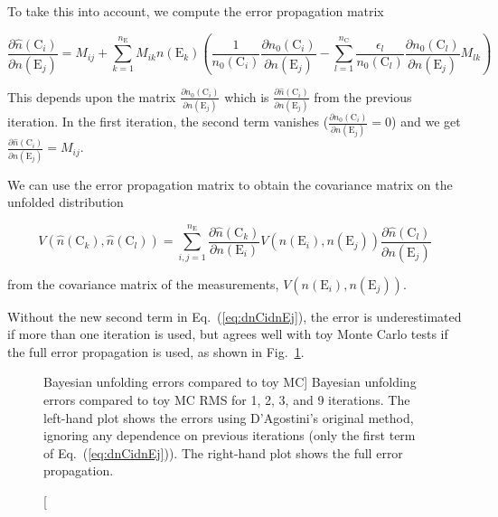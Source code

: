 \documentclass[12pt,a4paper]{article}
\newcommand{\E}{\mathrm{E}}
\newcommand{\C}{\mathrm{C}}
\newcommand{\dd}[2]{\frac{\partial{#1}}{\partial{#2}}}
\begin{document}
To take this into account, we compute the error propagation matrix

\begin{equation}
\dd{\hat{n}(\C_i)}{n(\E_j)} = M_{ij} + \sum_{k=1}^{n_{\E}} M_{ik} n(\E_k)
\left( \frac{1}{n_0(\C_i)} \dd{n_0(\C_i)}{n(\E_j)} - \sum_{l=1}^{n_{\C}} \frac{\epsilon_l}{n_0(\C_l)} \dd{n_0(\C_l)}{n(\E_j)} M_{lk} \right)
\label{eq:dnCidnEj}
\end{equation}

This depends upon the matrix $\dd{n_0(\C_i)}{n(\E_j)}$ which is $\dd{\hat{n}(\C_i)}{n(\E_j)}$ from the previous iteration.
In the first iteration, the second term vanishes ($\dd{n_0(\C_i)}{n(\E_j)}=0$) and we get $\dd{\hat{n}(\C_i)}{n(\E_j)} = M_{ij}$.

We can use the error propagation matrix to obtain the covariance matrix on the unfolded distribution

\begin{equation}
V(\hat{n}(\C_k),\hat{n}(\C_l)) = \sum_{i,j=1}^{n_{\E}} \dd{\hat{n}(\C_k)}{n(\E_i)} V(n(\E_i),n(\E_j)) \dd{\hat{n}(\C_l)}{n(\E_j)}
\label{eq:Vij}
\end{equation}

\noindent from the covariance matrix of the measurements, $V(n(\E_i),n(\E_j))$.

Without the new second term in Eq.~(\ref{eq:dnCidnEj}),
the error is underestimated if more than one iteration
is used, but agrees well with toy Monte Carlo tests if the full error propagation is used,
as shown in Fig.~\ref{fig:bayes_errors}.%
\begin{figure}[ht]
%
\caption
[Bayesian unfolding errors compared to toy MC]%
{Bayesian unfolding errors compared to toy MC RMS for 1, 2, 3, and 9 iterations.
The left-hand plot shows the errors using D'Agostini's original method,
ignoring any dependence on previous iterations (only the first term of Eq.~(\ref{eq:dnCidnEj})).
The right-hand plot shows the full error propagation.}%
\label{fig:bayes_errors}%
\end{figure}
\end{document}
